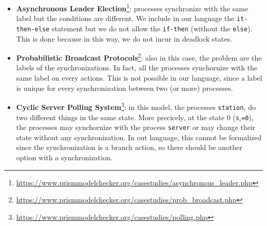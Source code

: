 \begin{itemize}
\item \textbf{Asynchronous Leader Election}\footnote{\url{https://www.prismmodelchecker.org/casestudies/asynchronous_leader.php}}:
 processes synchronize with the same label but the conditions are different.
 We include in our language the \texttt{it-then-else} statement but we do not allow 
 the \texttt{if-then} (without the \texttt{else}). This is done because in this way, we do not 
 incur in deadlock states.
\item  \textbf{Probabilistic Broadcast Protocols}\footnote{\url{https://www.prismmodelchecker.org/casestudies/prob_broadcast.php}}:
 also in this case, the problem are the labels of the synchronizations.
 In fact, all the processes synchornize with the same label on every actions.
 This is not possible in our language, since a label is unique for every synchronization between two (or more) processes.
\item \textbf{Cyclic Server Polling System}\footnote{\url{https://www.prismmodelchecker.org/casestudies/polling.php}}:
 in this model, the processes \texttt{station$_i$} do two different things in the same state.
 More precicely, at the state 0 (\texttt{s$_i$=0}), the processes may synchornize with the process
 \texttt{server} or may change their state without any synchronization.
 In out language, this cannot be formalized since the synchronization is a branch action,
 so there should be another option with a synchronization.


\end{itemize}